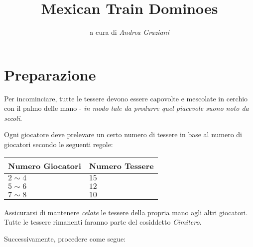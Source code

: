 \documentclass[sigconf,10pt]{acmart}
\begin{document}
\title{Mexican Train Dominoes}

\author{a cura di \textit{Andrea Graziani}}

\renewcommand{\shortauthors}{}
\maketitle

\section{Preparazione}

Per incominciare, tutte le tessere devono essere capovolte e mescolate in cerchio con il palmo delle mano - \textit{in modo tale da produrre quel piacevole suono noto da secoli}.                                                                                                                                                       

Ogni giocatore deve prelevare un certo numero di tessere in base al numero di giocatori secondo le seguenti regole:\\

\begin{center}
\begin{tabular}{l|l}
\toprule
Numero Giocatori & Numero Tessere \\
\midrule
$2\sim4$ & $15$ \\
$5\sim6$ & $12$ \\
$7\sim8$ & $10$ \\
\bottomrule
\end{tabular}
\end{center}

Assicurarsi di mantenere \textit{celate} le tessere della propria mano agli altri giocatori. Tutte le tessere rimanenti faranno parte del cosiddetto \textit{Cimitero}. 

Successivamente, procedere come segue:
\end{document}

